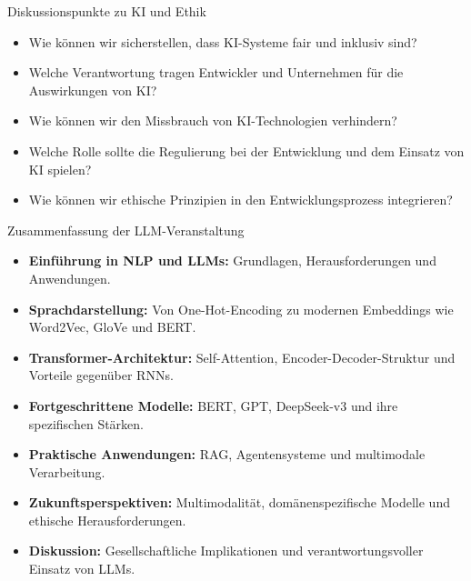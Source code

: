 \documentclass[aspectratio=1610, xcolor=dvipsnames, 9pt]{beamer}
\begin{document}
\begin{frame}{Diskussionspunkte zu KI und Ethik}
  \begin{itemize}
    \item Wie können wir sicherstellen, dass KI-Systeme fair und inklusiv sind? \\
    \item Welche Verantwortung tragen Entwickler und Unternehmen für die Auswirkungen von KI? \\
    \item Wie können wir den Missbrauch von KI-Technologien verhindern? \\
    \item Welche Rolle sollte die Regulierung bei der Entwicklung und dem Einsatz von KI spielen? \\
    \item Wie können wir ethische Prinzipien in den Entwicklungsprozess integrieren?
  \end{itemize}
\end{frame}


\begin{frame}{Zusammenfassung der LLM-Veranstaltung}
  \begin{itemize}
    \item \textbf{Einführung in NLP und LLMs:} Grundlagen, Herausforderungen und Anwendungen. \\
    \item \textbf{Sprachdarstellung:} Von One-Hot-Encoding zu modernen Embeddings wie Word2Vec, GloVe und BERT. \\
    \item \textbf{Transformer-Architektur:} Self-Attention, Encoder-Decoder-Struktur und Vorteile gegenüber RNNs. \\
    \item \textbf{Fortgeschrittene Modelle:} BERT, GPT, DeepSeek-v3 und ihre spezifischen Stärken. \\
    \item \textbf{Praktische Anwendungen:} RAG, Agentensysteme und multimodale Verarbeitung. \\
    \item \textbf{Zukunftsperspektiven:} Multimodalität, domänenspezifische Modelle und ethische Herausforderungen. \\
    \item \textbf{Diskussion:} Gesellschaftliche Implikationen und verantwortungsvoller Einsatz von LLMs.
  \end{itemize}
\end{frame}
\end{document}
